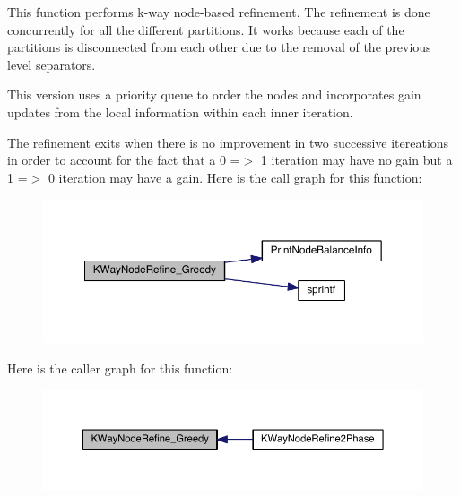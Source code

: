 This function performs k-\/way node-\/based refinement. The refinement is done concurrently for all the different partitions. It works because each of the partitions is disconnected from each other due to the removal of the previous level separators.

This version uses a priority queue to order the nodes and incorporates gain updates from the local information within each inner iteration.

The refinement exits when there is no improvement in two successive itereations in order to account for the fact that a 0 =$>$ 1 iteration may have no gain but a 1 =$>$ 0 iteration may have a gain. Here is the call graph for this function\+:\nopagebreak
\begin{figure}[H]
\begin{center}
\leavevmode
\includegraphics[width=350pt]{a00951_a5c9aaeced318b88b4ad50dcb484d47b1_cgraph}
\end{center}
\end{figure}
Here is the caller graph for this function\+:\nopagebreak
\begin{figure}[H]
\begin{center}
\leavevmode
\includegraphics[width=350pt]{a00951_a5c9aaeced318b88b4ad50dcb484d47b1_icgraph}
\end{center}
\end{figure}
\mbox{\label{a00951_ad38351510bbf07393425b90ea3c4f5bd}} 
